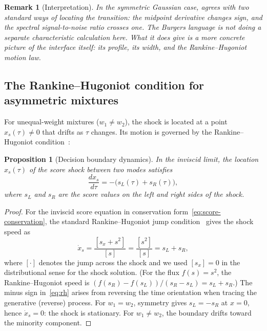 \documentclass[11pt]{article}
\newtheorem{proposition}[theorem]{Proposition}
\newtheorem{remark}[theorem]{Remark}
\begin{document}
\begin{remark}[Interpretation]\label{rem:interpretation}
In the symmetric Gaussian case,  agrees with two standard ways of locating the transition: the midpoint derivative changes sign, and the spectral signal-to-noise ratio crosses one. The Burgers language is not doing a separate characteristic calculation here. What it does give is a more concrete picture of the interface itself: its profile, its width, and the Rankine--Hugoniot motion law.
\end{remark}

\subsection{The Rankine--Hugoniot condition for asymmetric mixtures}\label{sec:shocks:rh}

For unequal-weight mixtures ($w_1 \neq w_2$), the shock is located at a point $x_s(\tau) \neq 0$ that drifts as $\tau$ changes.
Its motion is governed by the Rankine--Hugoniot condition~\citep{rankine1870thermodynamic, hugoniot1889propagation, lax1957hyperbolic}:

\begin{proposition}[Decision boundary dynamics]\label{prop:rh}
In the inviscid limit, the location $x_s(\tau)$ of the score shock between two modes satisfies
\begin{equation}\label{eq:rh}
  \frac{dx_s}{d\tau} = -\bigl(s_L(\tau) + s_R(\tau)\bigr),
\end{equation}
where $s_L$ and $s_R$ are the score values on the left and right sides of the shock.
\end{proposition}

\begin{proof}
For the inviscid score equation in conservation form~\eqref{eq:score-conservation}, the standard Rankine--Hugoniot jump condition~\citep[Thm.~3.4.1]{evans2010partial} gives the shock speed as
\[
  \dot{x}_s = \frac{[s_x + s^2]}{[s]} = \frac{[s^2]}{[s]} = s_L + s_R,
\]
where $[\cdot]$ denotes the jump across the shock and we used $[s_x] = 0$ in the distributional sense for the shock solution.
(For the flux $f(s) = s^2$, the Rankine--Hugoniot speed is $(f(s_R) - f(s_L))/(s_R - s_L) = s_L + s_R$.)
The minus sign in~\eqref{eq:rh} arises from reversing the time orientation when tracing the generative (reverse) process.
For $w_1 = w_2$, symmetry gives $s_L = -s_R$ at $x = 0$, hence $\dot{x}_s = 0$: the shock is stationary.
For $w_1 \neq w_2$, the boundary drifts toward the minority component.
\end{proof}
\end{document}
